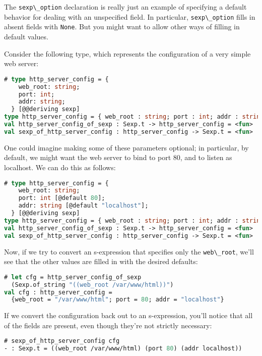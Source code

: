 The \passthrough{\lstinline!sexp\_option!} declaration is really just an
example of specifying a default behavior for dealing with an unspecified
field. In particular, \passthrough{\lstinline!sexp\_option!} fills in
absent fields with \passthrough{\lstinline!None!}. But you might want to
allow other ways of filling in default values.

Consider the following type, which represents the configuration of a
very simple web server:

\begin{lstlisting}[language=Caml]
# type http_server_config = {
    web_root: string;
    port: int;
    addr: string;
  } [@@deriving sexp]
type http_server_config = { web_root : string; port : int; addr : string; }
val http_server_config_of_sexp : Sexp.t -> http_server_config = <fun>
val sexp_of_http_server_config : http_server_config -> Sexp.t = <fun>
\end{lstlisting}

One could imagine making some of these parameters optional; in
particular, by default, we might want the web server to bind to port 80,
and to listen as localhost. We can do this as follows:

\begin{lstlisting}[language=Caml]
# type http_server_config = {
    web_root: string;
    port: int [@default 80];
    addr: string [@default "localhost"];
  } [@@deriving sexp]
type http_server_config = { web_root : string; port : int; addr : string; }
val http_server_config_of_sexp : Sexp.t -> http_server_config = <fun>
val sexp_of_http_server_config : http_server_config -> Sexp.t = <fun>
\end{lstlisting}

Now, if we try to convert an s-expression that specifies only the
\passthrough{\lstinline!web\_root!}, we'll see that the other values are
filled in with the desired defaults:

\begin{lstlisting}[language=Caml]
# let cfg = http_server_config_of_sexp
  (Sexp.of_string "((web_root /var/www/html))")
val cfg : http_server_config =
  {web_root = "/var/www/html"; port = 80; addr = "localhost"}
\end{lstlisting}

If we convert the configuration back out to an s-expression, you'll
notice that all of the fields are present, even though they're not
strictly necessary:

\begin{lstlisting}[language=Caml]
# sexp_of_http_server_config cfg
- : Sexp.t = ((web_root /var/www/html) (port 80) (addr localhost))
\end{lstlisting}

